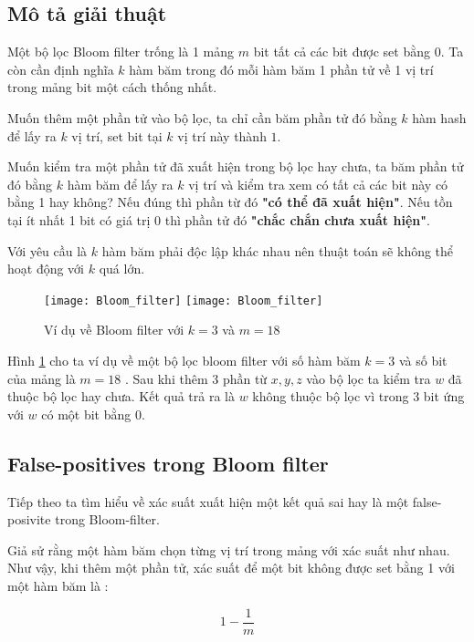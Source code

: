\subsection{Mô tả giải thuật}

Một bộ lọc Bloom filter trống là 1 mảng $m$ bit tất cả các bit được set bằng $0$. Ta còn cần định nghĩa $k$ hàm băm trong đó mỗi hàm băm 1 phần tử về 1 vị trí trong mảng bit một cách thống nhất. 

Muốn thêm một phần tử vào bộ lọc, ta chỉ cần băm phần tử đó bằng $k$ hàm hash để lấy ra $k$ vị trí, set bit tại $k$ vị trí này thành $1$.

Muốn kiểm tra một phần tử đã xuất hiện trong bộ lọc hay chưa, ta băm phần tử đó bằng $k$ hàm băm để lấy ra $k$ vị trí và kiểm tra xem có tất cả các bit này có bằng 1 hay không? Nếu đúng thì phần từ đó \textbf{"có thể đã xuất hiện"}. Nếu tồn tại ít nhất 1 bit có giá trị 0 thì phần tử đó \textbf{"chắc chắn chưa xuất hiện"}.

Với yêu cầu là $k$ hàm băm phải độc lập khác nhau nên thuật toán sẽ không thể hoạt động với $k$ quá lớn.
\begin{figure} [!htbp]
  \begin{center}
    \ifpdf
      \texttt{[image: Bloom\_filter]}
    \else
      \texttt{[image: Bloom\_filter]}
    \fi
    \caption{Ví dụ về Bloom filter với $k=3$ và $m=18$}
    \label{bloomfilter_img}
  \end{center}
\end{figure}

Hình \ref{bloomfilter_img} cho ta ví dụ về một bộ lọc bloom filter với số hàm băm $k =3$ và số bit của mảng là $m = 18$ . Sau khi thêm 3 phần từ $x,y,z$ vào bộ lọc ta kiểm tra $w$ đã thuộc bộ lọc hay chưa. Kết quả trả ra là $w$ không thuộc bộ lọc vì trong 3 bit ứng với $w$ có một bit bằng 0. 

\subsection{False-positives trong Bloom filter}

Tiếp theo ta tìm hiểu về xác suất xuất hiện một kết quả sai hay là một false-posivite trong Bloom-filter.

Giả sử rằng một hàm băm chọn từng vị trí trong mảng với xác suất như nhau. Như vậy, khi thêm một phần tử, xác suất để một bit không được set bằng 1 với một hàm băm là :
\begin{large}
\[ 1 - \dfrac{1}{m}\]
\end{large}

